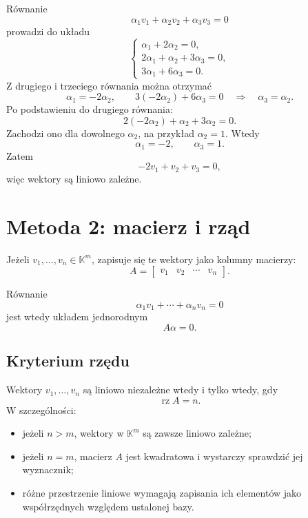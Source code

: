 \documentclass{article}
\begin{document}
Równanie
\[
\alpha_1v_1+\alpha_2v_2+\alpha_3v_3=0
\]
prowadzi do układu
\[
\begin{cases}
\alpha_1+2\alpha_2=0,\\
2\alpha_1+\alpha_2+3\alpha_3=0,\\
3\alpha_1+6\alpha_3=0.
\end{cases}
\]
Z drugiego i trzeciego równania można otrzymać
\[
\alpha_1=-2\alpha_2,
\qquad
3(-2\alpha_2)+6\alpha_3=0
\quad\Longrightarrow\quad
\alpha_3=\alpha_2.
\]
Po podstawieniu do drugiego równania:
\[
2(-2\alpha_2)+\alpha_2+3\alpha_2=0.
\]
Zachodzi ono dla dowolnego $\alpha_2$, na przykład $\alpha_2=1$. Wtedy
\[
\alpha_1=-2,\qquad \alpha_3=1.
\]
Zatem
\[
-2v_1+v_2+v_3=0,
\]
więc wektory są liniowo zależne.

\section{Metoda 2: macierz i rząd}

Jeżeli $v_1,\ldots,v_n\in\mathbb K^m$, zapisuje się te wektory jako kolumny macierzy:
\[
A=\begin{bmatrix}
v_1&v_2&\cdots&v_n
\end{bmatrix}.
\]

Równanie
\[
\alpha_1v_1+\cdots+\alpha_nv_n=0
\]
jest wtedy układem jednorodnym
\[
A\alpha=0.
\]

\subsection{Kryterium rzędu}
Wektory $v_1,\ldots,v_n$ są liniowo niezależne wtedy i tylko wtedy, gdy
\[
\operatorname{rz}A=n.
\]
W szczególności:
\begin{itemize}
    \item jeżeli $n>m$, wektory w $\mathbb K^m$ są zawsze liniowo zależne;
    \item jeżeli $n=m$, macierz $A$ jest kwadratowa i wystarczy sprawdzić jej wyznacznik;
    \item różne przestrzenie liniowe wymagają zapisania ich elementów jako współrzędnych względem ustalonej bazy.
\end{itemize}
\end{document}

